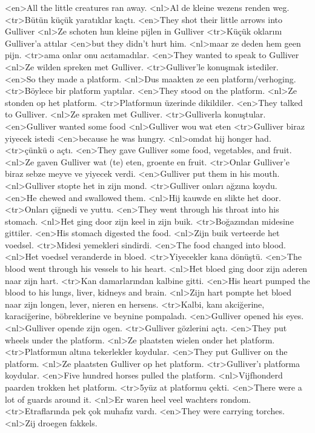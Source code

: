 <en>All the little creatures ran away.
<nl>Al de kleine wezens renden weg.
<tr>Bütün küçük yaratıklar kaçtı.
<en>They shot their little arrows into Gulliver
<nl>Ze schoten hun kleine pijlen in Gulliver
<tr>Küçük oklarını Gulliver’a attılar
<en>but they didn’t hurt him.
<nl>maar ze deden hem geen pijn.
<tr>ama onlar onu acıtamadılar.
<en>They wanted to speak to Gulliver
<nl>Ze wilden spreken met Gulliver.
<tr>Gulliver’le konuşmak istediler.
<en>So they made a platform.
<nl>Dus maakten ze een platform/verhoging.
<tr>Böylece bir platform yaptılar.
<en>They stood on the platform.
<nl>Ze stonden op het platform.
<tr>Platformun üzerinde dikildiler.
<en>They talked to Gulliver.
<nl>Ze spraken met Gulliver.
<tr>Gulliverla konuştular.
<en>Gulliver wanted some food
<nl>Gulliver wou wat eten
<tr>Gulliver biraz yiyecek istedi
<en>because he was hungry.
<nl>omdat hij honger had.
<tr>çünkü o açtı.
<en>They gave Gulliver some food, vegetables, and fruit.
<nl>Ze gaven Gulliver wat (te) eten, groente en fruit.
<tr>Onlar Gulliver’e biraz sebze meyve ve yiyecek verdi.
<en>Gulliver put them in his mouth.
<nl>Gulliver stopte het in zijn mond.
<tr>Gulliver onları ağzına koydu.
<en>He chewed and swallowed them.
<nl>Hij kauwde en slikte het door.
<tr>Onları çiğnedi ve yuttu.
<en>They went through his throat into his stomach.
<nl>Het ging door zijn keel in zijn buik.
<tr>Boğazından midesine gittiler.
<en>His stomach digested the food.
<nl>Zijn buik verteerde het voedsel.
<tr>Midesi yemekleri sindirdi.
<en>The food changed into blood.
<nl>Het voedsel veranderde in bloed.
<tr>Yiyecekler kana dönüştü.
<en>The blood went through his vessels to his heart.
<nl>Het bloed ging door zijn aderen naar zijn hart.
<tr>Kan damarlarından kalbine gitti.
<en>His heart pumped the blood to his lungs, liver, kidneys and brain.
<nl>Zijn hart pompte het bloed naar zijn longen, lever, nieren en hersens.
<tr>Kalbi, kanı akciğerine, karaciğerine, böbreklerine ve beynine pompaladı.
<en>Gulliver opened his eyes.
<nl>Gulliver opende zijn ogen.
<tr>Gulliver gözlerini açtı.
<en>They put wheels under the platform.
<nl>Ze plaatsten wielen onder het platform.
<tr>Platformun altına tekerlekler koydular.
<en>They put Gulliver on the platform.
<nl>Ze plaatsten Gulliver op het platform.
<tr>Gulliver’ı platforma koydular.
<en>Five hundred horses pulled the platform.
<nl>Vijfhonderd paarden trokken het platform.
<tr>5yüz at platformu çekti.
<en>There were a lot of guards around it.
<nl>Er waren heel veel wachters rondom.
<tr>Etraflarında pek çok muhafız vardı.
<en>They were carrying torches.
<nl>Zij droegen fakkels.
